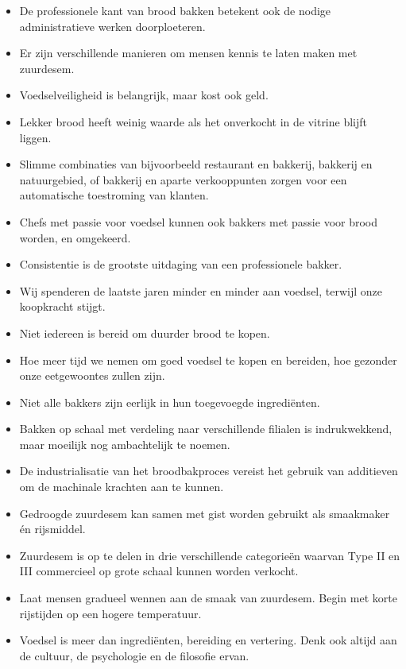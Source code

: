 \documentclass[
  11pt,
  dutch,
]{memoir}
\providecommand{\tightlist}{%
  \setlength{\itemsep}{0pt}\setlength{\parskip}{0pt}}
\begin{document}
\begin{itemize}
\tightlist
\item
  De professionele kant van brood bakken betekent ook de nodige
  administratieve werken doorploeteren.
\item
  Er zijn verschillende manieren om mensen kennis te laten maken met
  zuurdesem.
\item
  Voedselveiligheid is belangrijk, maar kost ook geld.
\item
  Lekker brood heeft weinig waarde als het onverkocht in de vitrine
  blijft liggen.
\item
  Slimme combinaties van bijvoorbeeld restaurant en bakkerij, bakkerij
  en natuurgebied, of bakkerij en aparte verkooppunten zorgen voor een
  automatische toestroming van klanten.
\item
  Chefs met passie voor voedsel kunnen ook bakkers met passie voor brood
  worden, en omgekeerd.
\item
  Consistentie is de grootste uitdaging van een professionele bakker.
\item
  Wij spenderen de laatste jaren minder en minder aan voedsel, terwijl
  onze koopkracht stijgt.
\item
  Niet iedereen is bereid om duurder brood te kopen.
\item
  Hoe meer tijd we nemen om goed voedsel te kopen en bereiden, hoe
  gezonder onze eetgewoontes zullen zijn.
\item
  Niet alle bakkers zijn eerlijk in hun toegevoegde ingrediënten.
\item
  Bakken op schaal met verdeling naar verschillende filialen is
  indrukwekkend, maar moeilijk nog ambachtelijk te noemen.
\item
  De industrialisatie van het broodbakproces vereist het gebruik van
  additieven om de machinale krachten aan te kunnen.
\item
  Gedroogde zuurdesem kan samen met gist worden gebruikt als smaakmaker
  én rijsmiddel.
\item
  Zuurdesem is op te delen in drie verschillende categorieën waarvan
  Type II en III commercieel op grote schaal kunnen worden verkocht.
\item
  Laat mensen gradueel wennen aan de smaak van zuurdesem. Begin met
  korte rijstijden op een hogere temperatuur.
\item
  Voedsel is meer dan ingrediënten, bereiding en vertering. Denk ook
  altijd aan de cultuur, de psychologie en de filosofie ervan.
\end{itemize}
\end{document}
